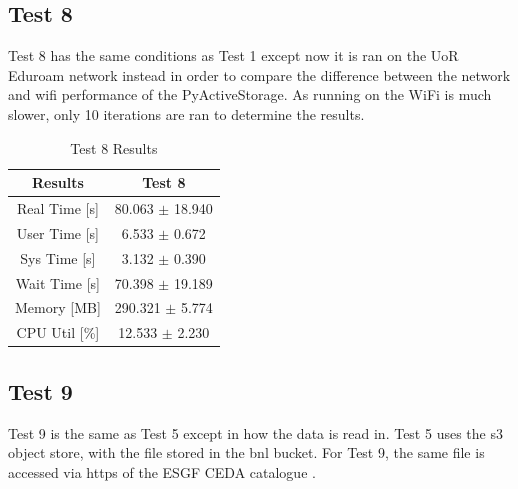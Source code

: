 \documentclass{article}
\begin{document}
\break
\subsection{Test 8}
Test 8 has the same conditions as Test 1 except now it is ran on the UoR Eduroam network instead in order to compare the difference between the network and wifi performance of the PyActiveStorage. As running on the WiFi is much slower, only 10 iterations are ran to determine the results.

\begin{table}[h!]
    \centering
    \begin{tabular}{cc}
        \hline
        \textbf{Results} & Test 8              \\ \hline
        Real Time [s]    &80.063 $\pm$ 18.940 \\
        User Time [s]    &6.533 $\pm$ 0.672   \\
        Sys Time [s]     &3.132 $\pm$ 0.390   \\
        Wait Time [s]    &70.398 $\pm$ 19.189 \\
        Memory [MB]      &290.321 $\pm$ 5.774 \\
        CPU Util [\%]    &12.533 $\pm$ 2.230  \\
        \hline
    \end{tabular}
    \caption{Test 8 Results}
    \label{tab:T8_Results}
\end{table}



\subsection{Test 9}
Test 9 is the same as Test 5 except in how the data is read in. Test 5 uses the s3 object store, with the file stored in the bnl bucket. For Test 9, the same file is accessed via https of the ESGF CEDA catalogue . 
\end{document}
